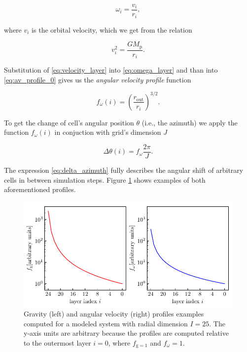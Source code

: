     \begin{equation}
        \omega_i = \frac{v_i}{r_i},
        \label{eq:omega_layer}
    \end{equation}

    where $v_i$ is the orbital velocity, which we get from the relation

    \begin{equation}
        v_i^2 = \frac{G M_{\mathrm{p}}}{r_i}.
        \label{eq:velocity_layer}
    \end{equation}

    Substitution of \eqref{eq:velocity_layer} into \eqref{eq:omega_layer} and than into \eqref{eq:av_profile_0} gives us the \emph{angular velocity profile} function

    \begin{equation}
        f_{\omega}(i) = \left(\frac{r_{\mathrm{out}}}{r_i}\right)^{3/2}.
    \end{equation}

    To get the change of cell's angular position $\theta$ (i.e., the azimuth) we apply the function $f_{\omega}(i)$ in conjuction with grid's dimension $J$

    \begin{equation}
        \Delta \theta (i) = f_{\omega} \frac{2 \pi}{J}.
        \label{eq:delta_azimuth} 
    \end{equation}

    The expression \eqref{eq:delta_azimuth} fully describes the angular shift of arbitrary cells in between simulation steps. Figure \ref{fig:plot_omega_g_profiles} shows examples of both aforementioned profiles.
    
    \begin{figure}[H]
    \centering
    \includegraphics[width=\columnwidth]{img/plot_omega_g_profiles.pdf}
        \caption{Gravity (left) and angular velocity (right) profiles examples computed for a modeled system with radial dimension $I = 25$. The y-axis units are arbitrary because the profiles are computed relative to the outermost layer $i = 0$, where $f_{\mathrm{g} = 1}$ and $f_{\omega} = 1$.}
    \label{fig:plot_omega_g_profiles}
    \end{figure}
        
